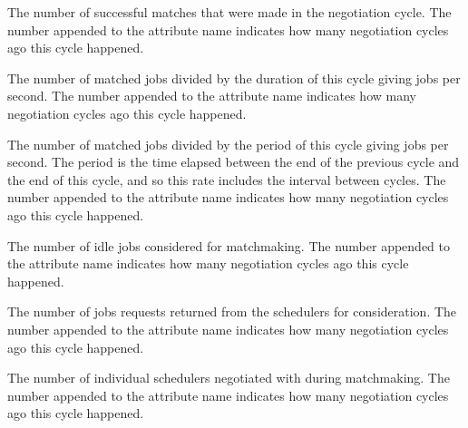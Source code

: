 \begin{description}
\label{attr:LastNegotiationCycleMatches<X>}
\item[\AdAttr{LastNegotiationCycleMatches<X>}:] The number of successful
matches that were made in the negotiation cycle.
The number  appended to the attribute name 
indicates how many negotiation cycles ago this cycle happened.

\label{attr:LastNegotiationCycleMatchRate<X>}
\item[\AdAttr{LastNegotiationCycleMatchRate<X>}:] 
The number of matched jobs divided by the duration of this cycle giving
jobs per second.
The number  appended to the attribute name indicates 
how many negotiation cycles ago this cycle happened.

\label{attr:LastNegotiationCycleMatchRateSustained<X>}
\item[\AdAttr{LastNegotiationCycleMatchRateSustained<X>}:] 
The number of matched jobs divided by the period of this cycle giving
jobs per second.
The period is the time elapsed between the end of the previous cycle 
and the end of this cycle,
and so this rate includes the interval between cycles.
The number  appended to the attribute name indicates 
how many negotiation cycles ago this cycle happened.

\label{attr:LastNegotiationCycleNumIdleJobs<X>}
\item[\AdAttr{LastNegotiationCycleNumIdleJobs<X>}:] 
The number of idle jobs considered for matchmaking.  
The number  appended to the attribute name indicates 
how many negotiation cycles ago this cycle happened.

\label{attr:LastNegotiationCycleNumJobsConsidered<X>}
\item[\AdAttr{LastNegotiationCycleNumJobsConsidered<X>}:] 
The number of jobs requests returned from the schedulers for consideration.
The number  appended to the attribute name indicates 
how many  negotiation  cycles ago this cycle happened.

\label{attr:LastNegotiationCycleNumSchedulers<X>}
\item[\AdAttr{LastNegotiationCycleNumSchedulers<X>}:] 
The number of individual schedulers negotiated with during matchmaking.
The number  appended to the attribute name indicates 
how many negotiation cycles ago this cycle happened.


\end{description}
